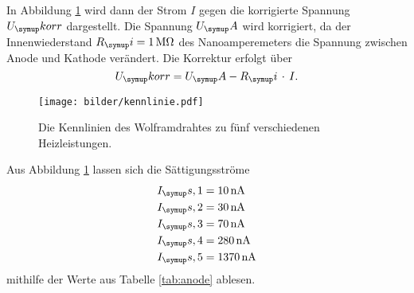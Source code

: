 In Abbildung \ref{fig:kenn} wird dann der Strom $I$ gegen die korrigierte Spannung $U_\su{korr}$
dargestellt. Die Spannung $U_\su{A}$ wird korrigiert, da der Innenwiederstand
$R_\su{i} = \SI{1}{\mega\ohm}$ des Nanoamperemeters die Spannung zwischen
Anode und Kathode verändert. Die Korrektur erfolgt über
\begin{equation}
  U_\su{korr} = U_\su{A}-R_\su{i}\,\cdot\, I. \\
\end{equation}
\begin{figure}[H]
  \centering
  \texttt{[image: bilder/kennlinie.pdf]}
  \caption{Die Kennlinien des Wolframdrahtes zu fünf verschiedenen Heizleistungen.}
  \label{fig:kenn}
\end{figure}
Aus Abbildung \ref{fig:kenn} lassen sich die Sättigungsströme
\begin{align*}
  I_\su{s,1} &= \SI{10}{\nano\ampere}  \\
  I_\su{s,2} &= \SI{30}{\nano\ampere} \\
  I_\su{s,3} &= \SI{70}{\nano\ampere}  \\
  I_\su{s,4} &= \SI{280}{\nano\ampere}  \\
  I_\su{s,5} &= \SI{1370}{\nano\ampere}  \\
\end{align*}
mithilfe der Werte aus Tabelle \ref{tab:anode} ablesen.

